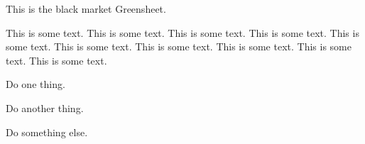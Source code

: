 \documentclass[green]{guildcamp3}
\begin{document}
	
	\name{\gBlackMarket{}}
	
	
	
	
	This is the black market Greensheet.
	
	This is some text.  This is some text.  This is some text.  This is
	some text.  This is some text.  This is some text.  This is some text.
	This is some text.  This is some text.  This is some text.
	
	
	\begin{enum}[Directions]
		\item Do one thing.
		\item Do another thing.
		\item Do something else.
	\end{enum}
	
	
\end{document}
